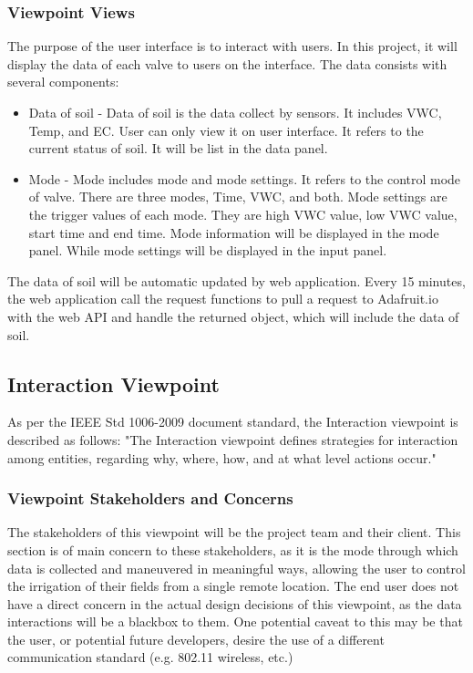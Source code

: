 \documentclass[onecolumn, draftclsnofoot,10pt, compsoc]{IEEEtran}
\newcounter{subsubsubsection}[subsubsection]
\begin{document}
	\subsubsection{Viewpoint Views}
	The purpose of the user interface is to interact with users. In this project, it will display the data of each valve to users on the interface. The data consists with several components:
	\begin{itemize}
		\item Data of soil - Data of soil is the data collect by sensors. It includes VWC, Temp, and EC. User can only view it on user interface. It refers to the current status of soil. It will be list in the data panel.
		\item Mode - Mode includes mode and mode settings. It refers to the control mode of valve. There are three modes, Time, VWC, and both. Mode settings are the trigger values of each mode. They are high VWC value, low VWC value, start time and end time. Mode information will be displayed in the mode panel. While mode settings will be displayed in the input panel.
	\end{itemize}
	The data of soil will be automatic updated by web application. Every 15 minutes, the web application call the request functions to pull a request to Adafruit.io with the web API and handle the returned object, which will include the data of soil.
	\subsection{Interaction Viewpoint}
	As per the IEEE Std 1006-2009 document standard, the Interaction viewpoint is described as follows: "The Interaction viewpoint defines strategies for interaction among entities, regarding why, where, how, and at what level actions occur."
	\subsubsection{Viewpoint Stakeholders and Concerns}
	The stakeholders of this viewpoint will be the project team and their client.
	This section is of main concern to these stakeholders, as it is the mode through which data is collected and maneuvered in meaningful ways, allowing the user to control the irrigation of their fields from a single remote location.
	The end user does not have a direct concern in the actual design decisions of this viewpoint, as the data interactions will be a blackbox to them.
	One potential caveat to this may be that the user, or potential future developers, desire the use of a different communication standard (e.g. 802.11 wireless, etc.)
\end{document}
